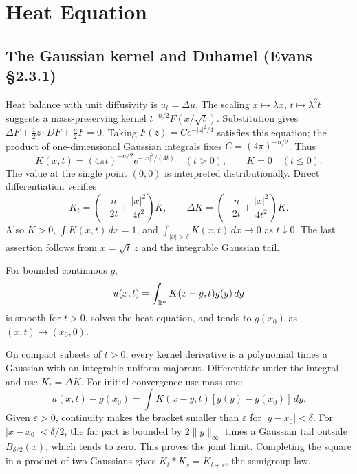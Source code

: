 \section{Heat Equation}
\label{sec:2-3}

\subsection{The Gaussian kernel and Duhamel (Evans \S2.3.1)}
Heat balance with unit diffusivity is $u_t=\Delta u$.
The scaling $x\mapsto\lambda x$, $t\mapsto\lambda^2t$ suggests a
mass-preserving kernel $t^{-n/2}F(x/\sqrt t)$.
Substitution gives
$\Delta F+\frac12 z\cdot DF+\frac n2 F=0$.
Taking $F(z)=C e^{-|z|^2/4}$ satisfies this equation; the product of
one-dimensional Gaussian integrals fixes $C=(4\pi)^{-n/2}$.
Thus
\[
 K(x,t)=(4\pi t)^{-n/2}e^{-|x|^2/(4t)}\quad(t>0),
 \qquad K=0\quad(t\leq0).
\]
The value at the single point $(0,0)$ is interpreted distributionally.
Direct differentiation verifies
\[
 K_t=\left(-\frac n{2t}+\frac{|x|^2}{4t^2}\right)K,\qquad
 \Delta K=\left(-\frac n{2t}+\frac{|x|^2}{4t^2}\right)K.
\]
Also $K>0$, $\int K(x,t)\,dx=1$, and
$\int_{|x|>\delta}K(x,t)\,dx\to0$ as $t\downarrow0$.
The last assertion follows from $x=\sqrt t\,z$ and the integrable
Gaussian tail.
\Needspace{45mm}

\begin{theorem}
For bounded continuous $g$,
\[
 u(x,t)=\int_{\mathbb{R}^n}K(x-y,t)g(y)\,dy
\]
is smooth for $t>0$, solves the heat equation, and tends to $g(x_0)$
as $(x,t)\to(x_0,0)$.
\end{theorem}
\begin{expandedproof}
On compact subsets of $t>0$, every kernel derivative is a polynomial
times a Gaussian with an integrable uniform majorant.
Differentiate under the integral and use $K_t=\Delta K$.
For initial convergence use mass one:
\[
 u(x,t)-g(x_0)=\int K(x-y,t)[g(y)-g(x_0)]\,dy.
\]
Given $\varepsilon>0$, continuity makes the bracket smaller than
$\varepsilon$ for $|y-x_0|<\delta$. For $|x-x_0|<\delta/2$, the far
part is bounded by $2\|g\|_\infty$ times a Gaussian tail outside
$B_{\delta/2}(x)$, which tends to zero. This proves the joint limit.
Completing the square in a product of two Gaussians gives
$K_t*K_s=K_{t+s}$, the semigroup law.
\end{expandedproof}
\Needspace{45mm}

